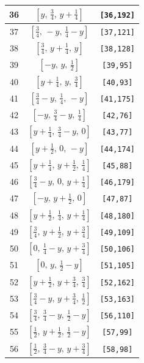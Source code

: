 \documentclass[fleqn,8pt]{jsarticle}
\begin{document}
\begin{longtable}{ccc}
36 & $\left[ y,\, \frac{3}{4},\, y + \frac{1}{4} \right]$ & {\tt [36,192]} \\ \hline
37 & $\left[ \frac{3}{4},\, - y,\, \frac{1}{4} - y \right]$ & {\tt [37,121]} \\ \hline
38 & $\left[ \frac{3}{4},\, y + \frac{1}{4},\, y \right]$ & {\tt [38,128]} \\ \hline
39 & $\left[ - y,\, y,\, \frac{1}{2} \right]$ & {\tt [39,95]} \\ \hline
40 & $\left[ y + \frac{1}{4},\, y,\, \frac{3}{4} \right]$ & {\tt [40,93]} \\ \hline
41 & $\left[ \frac{3}{4} - y,\, \frac{1}{4},\, - y \right]$ & {\tt [41,175]} \\ \hline
42 & $\left[ - y,\, \frac{3}{4} - y,\, \frac{1}{4} \right]$ & {\tt [42,76]} \\ \hline
43 & $\left[ y + \frac{1}{4},\, \frac{3}{4} - y,\, 0 \right]$ & {\tt [43,77]} \\ \hline
44 & $\left[ y + \frac{1}{2},\, 0,\, - y \right]$ & {\tt [44,174]} \\ \hline
45 & $\left[ y + \frac{1}{4},\, y + \frac{1}{2},\, \frac{1}{4} \right]$ & {\tt [45,88]} \\ \hline
46 & $\left[ \frac{3}{4} - y,\, 0,\, y + \frac{1}{4} \right]$ & {\tt [46,179]} \\ \hline
47 & $\left[ - y,\, y + \frac{1}{2},\, 0 \right]$ & {\tt [47,87]} \\ \hline
48 & $\left[ y + \frac{1}{2},\, \frac{1}{4},\, y + \frac{1}{4} \right]$ & {\tt [48,180]} \\ \hline
49 & $\left[ \frac{3}{4},\, y + \frac{1}{2},\, y + \frac{3}{4} \right]$ & {\tt [49,109]} \\ \hline
50 & $\left[ 0,\, \frac{1}{4} - y,\, y + \frac{3}{4} \right]$ & {\tt [50,106]} \\ \hline
51 & $\left[ 0,\, y,\, \frac{1}{2} - y \right]$ & {\tt [51,105]} \\ \hline
52 & $\left[ y + \frac{1}{2},\, y + \frac{3}{4},\, \frac{3}{4} \right]$ & {\tt [52,162]} \\ \hline
53 & $\left[ \frac{3}{4} - y,\, y + \frac{3}{4},\, \frac{1}{2} \right]$ & {\tt [53,163]} \\ \hline
54 & $\left[ \frac{3}{4},\, \frac{3}{4} - y,\, \frac{1}{2} - y \right]$ & {\tt [56,110]} \\ \hline
55 & $\left[ \frac{1}{2},\, y + \frac{1}{2},\, \frac{1}{2} - y \right]$ & {\tt [57,99]} \\ \hline
56 & $\left[ \frac{1}{2},\, \frac{3}{4} - y,\, y + \frac{3}{4} \right]$ & {\tt [58,98]} \\ \hline

\end{longtable}
\end{document}

